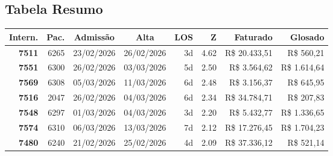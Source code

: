 \documentclass[a4paper,10pt]{article}
\begin{document}
\subsection{Tabela Resumo}
\begin{center}
\begin{longtable}{>{\scriptsize}r>{\scriptsize}r>{\scriptsize}c>{\scriptsize}c>{\scriptsize}r>{\scriptsize}r>{\scriptsize}r>{\scriptsize}r}
\toprule
\textbf{Intern.} & \textbf{Pac.} & \textbf{Admiss\~{a}o} & \textbf{Alta} & \textbf{LOS} & \textbf{Z} & \textbf{Faturado} & \textbf{Glosado} \\
\midrule
\endhead
\bottomrule
\endfoot

\textcolor{anomorange}{\textbf{7511}} & 6265 & 23/02/2026 & 26/02/2026 & 3d & \textcolor{anomorange}{4.62} & R\$ 20.433,51 & \textcolor{anomred}{R\$ 560,21} \\

\textcolor{anomyellow}{\textbf{7551}} & 6300 & 26/02/2026 & 03/03/2026 & 5d & \textcolor{anomyellow}{2.50} & R\$ 3.564,62 & \textcolor{anomred}{R\$ 1.614,64} \\

\textcolor{anomyellow}{\textbf{7569}} & 6308 & 05/03/2026 & 11/03/2026 & 6d & \textcolor{anomyellow}{2.48} & R\$ 3.156,37 & \textcolor{anomred}{R\$ 645,95} \\

\textcolor{anomyellow}{\textbf{7516}} & 2047 & 26/02/2026 & 04/03/2026 & 6d & \textcolor{anomyellow}{2.34} & R\$ 34.784,71 & \textcolor{anomred}{R\$ 207,83} \\

\textcolor{anomyellow}{\textbf{7548}} & 6297 & 01/03/2026 & 04/03/2026 & 3d & \textcolor{anomyellow}{2.20} & R\$ 5.432,77 & \textcolor{anomred}{R\$ 1.336,65} \\

\textcolor{anomyellow}{\textbf{7574}} & 6310 & 06/03/2026 & 13/03/2026 & 7d & \textcolor{anomyellow}{2.12} & R\$ 17.276,45 & \textcolor{anomred}{R\$ 1.704,23} \\

\textcolor{anomyellow}{\textbf{7480}} & 6240 & 21/02/2026 & 25/02/2026 & 4d & \textcolor{anomyellow}{2.09} & R\$ 37.336,12 & \textcolor{anomred}{R\$ 521,14} \\

\end{longtable}\end{center}
\end{document}
